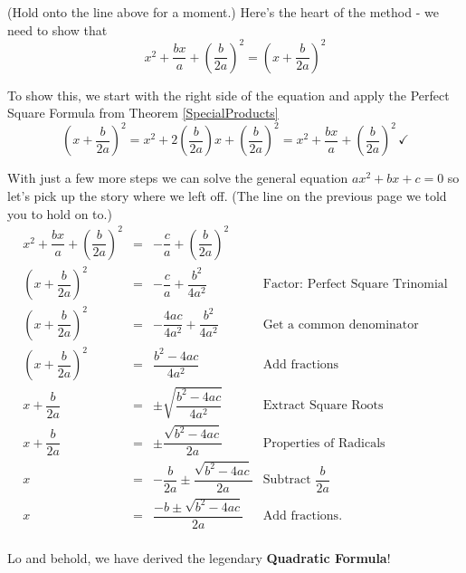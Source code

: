 \documentclass{ximera}
\begin{document}
(Hold onto the line above for a moment.)  Here's the heart of the method - we need to show that \[ x^2 + \dfrac{bx}{a} + \left(\dfrac{b}{2a}\right)^2 = \left(x + \dfrac{b}{2a}\right)^2 \]

To show this, we start with the right side of the equation and apply the Perfect Square Formula from Theorem \ref{SpecialProducts} \[ \left(x + \dfrac{b}{2a}\right)^2 = x^2 + 2\left(\dfrac{b}{2a}\right)x + \left(\dfrac{b}{2a}\right)^2 = x^2 + \dfrac{bx}{a} + \left(\dfrac{b}{2a}\right)^2 \, \checkmark \]

With just a few more steps we can solve the general equation $ax^{2} + bx + c = 0$ so let's pick up the story where we left off. (The line on the previous page we told you to hold on to.)\[ \begin{array}{rclr}

x^2 + \dfrac{bx}{a} + \left(\dfrac{b}{2a}\right)^2 & = & -\dfrac{c}{a} + \left(\dfrac{b}{2a}\right)^2 & \\ [8pt]
\left(x + \dfrac{b}{2a}\right)^2 & = & -\dfrac{c}{a} + \dfrac{b^2}{4a^2} & \text{Factor: Perfect Square Trinomial} \\ [3pt]

\left(x + \dfrac{b}{2a}\right)^2 & = & -\dfrac{4ac}{4a^2} + \dfrac{b^2}{4a^2} & \text{Get a common denominator}\\

\left(x + \dfrac{b}{2a}\right)^2 & = & \dfrac{b^2 - 4ac}{4a^2} & \text{Add fractions}\\ [5pt]

x + \dfrac{b}{2a} & = & \pm \sqrt{\dfrac{b^2 - 4ac}{4a^2}} & \text{Extract Square Roots} \\ [8pt]

x + \dfrac{b}{2a} & = & \pm \dfrac{\sqrt{b^2 - 4ac}}{2a} & \text{Properties of Radicals} \\ [8pt]

x  & = & - \dfrac{b}{2a} \pm \dfrac{\sqrt{b^2 - 4ac}}{2a} & \text{Subtract $\dfrac{b}{2a}$} \\ [8pt]

x  & = & \dfrac{-b \pm \sqrt{b^2 - 4ac}}{2a} & \text{Add fractions.} \\

\end{array}\]

Lo and behold, we have derived the legendary \textbf{Quadratic Formula}!

\medskip

\end{document}
